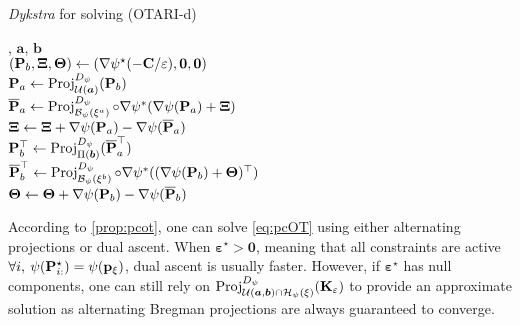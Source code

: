 \begin{algorithm}[H]
  \caption{\textit{Dykstra} for solving (OTARI-d)}
  \label{algo:Dykstra_pcot}
  \begin{algorithmic}[1]
      , $\bm{a}$, $\bm{b}$ \\
      \STATE $\left({\mathbf{P}}_b, \bm{\Xi}, \bm{\Theta} \right) \leftarrow \left(\nabla \psi^{\star}(-{\mathbf{C}} / \varepsilon), \mathbf{0}, \mathbf{0} \right)$ \\
          \STATE ${\mathbf{P}}_a \leftarrow \operatorname{Proj}^{D_\psi}_{{\mathcal{U}}(\bm{a})}({\mathbf{P}}_b)$ 
          \\
          \STATE $\overline{{\mathbf{P}}}_{a} \leftarrow \operatorname{Proj}^{D_\psi}_{\mathcal{B}_{\psi}(\xi^{a})}\circ \nabla \psi^*(\nabla \psi({\mathbf{P}}_a) + \bm{\Xi})$ 
          \\
          \STATE $\bm{\Xi} \leftarrow \bm{\Xi} + \nabla \psi({\mathbf{P}}_{a}) - \nabla \psi(\overline{{\mathbf{P}}}_{a})$
          \\
          \STATE ${\mathbf{P}}^\top_b \leftarrow \operatorname{Proj}^{D_\psi}_{\Pi(\bm{b})}(\overline{{\mathbf{P}}}_{a}^\top)$ 
          \\
          \STATE $\overline{{\mathbf{P}}}_{b}^\top \leftarrow \operatorname{Proj}^{D_\psi}_{\mathcal{B}_{\psi}(\xi^{b})}\circ \nabla \psi^*((\nabla \psi({\mathbf{P}}_b) + \bm{\Theta})^\top)$ 
          \\
          \STATE $\bm{\Theta} \leftarrow \bm{\Theta} + \nabla \psi({\mathbf{P}}_{b}) - \nabla \psi(\overline{{\mathbf{P}}}_{b})$
      \ENDWHILE  
\end{algorithmic}
\end{algorithm}

According to \cref{prop:pcot}, one can solve \eqref{eq:pcOT} using either alternating projections or dual ascent. 
When $\bm{\varepsilon}^\star \bm{>} \bm{0}$, meaning that all constraints are active \ie $\forall i, \: \psi({\mathbf{P}}^\star_{i:}) = \psi(\mathbf{p}_{\xi})$, dual ascent is usually faster. However, if $\bm{\varepsilon}^\star$ has null components, one can still rely on $\operatorname{Proj}^{D_\psi}_{{\mathcal{U}}(\bm{a}, \bm{b}) \cap \mathcal{H}_\psi(\xi)}({\mathbf{K}}_\varepsilon)$ to provide an approximate solution as alternating Bregman projections are always guaranteed to converge.

